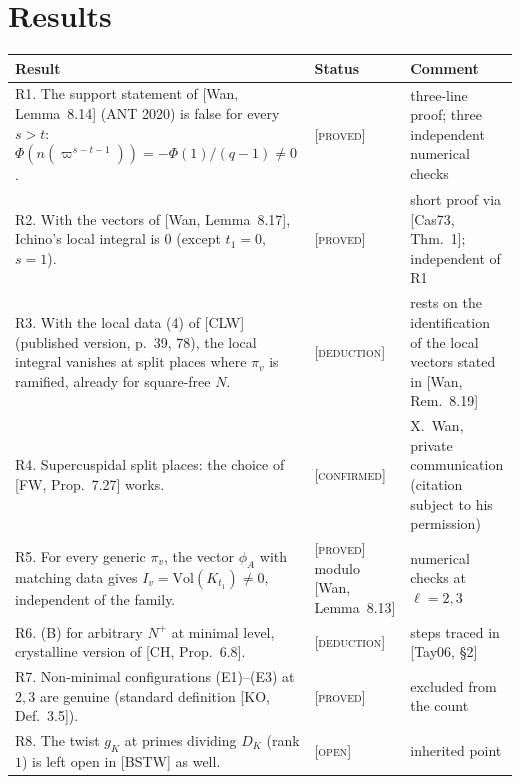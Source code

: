 \documentclass[11pt]{amsart}
\newcommand{\stat}[1]{\textsc{[#1]}}
\newcommand{\Vol}{\mathrm{Vol}}
\begin{document}
\section{Results}
\begin{center}\small
\begin{tabular}{p{7.4cm}p{2.3cm}p{4.2cm}}
\toprule
Result & Status & Comment\\ \midrule
R1. The support statement of [Wan, Lemma~8.14] (ANT 2020) is false for every $s>t$: $\Phi(n(\varpi^{s-t-1}))=-\Phi(1)/(q-1)\neq0$. & \stat{proved} & three-line proof; three independent numerical checks\\
R2. With the vectors of [Wan, Lemma~8.17], Ichino's local integral is $0$ (except $t_1=0$, $s=1$). & \stat{proved} & short proof via [Cas73, Thm.~1]; independent of R1\\
R3. With the local data (4) of [CLW] (published version, p.~39, 78), the local integral vanishes at split places where $\pi_v$ is ramified, already for square-free $N$. & \stat{deduction} & rests on the identification of the local vectors stated in [Wan, Rem.~8.19]\\
R4. Supercuspidal split places: the choice of [FW, Prop.~7.27] works. & \stat{confirmed} & X.~Wan, private communication (citation subject to his permission)\\
R5. For every generic $\pi_v$, the vector $\phi_A$ with matching data gives $I_v=\Vol(K_{t_1})\neq0$, independent of the family. & \stat{proved} modulo [Wan, Lemma~8.13] & numerical checks at $\ell=2,3$\\
R6. (B) for arbitrary $N^+$ at minimal level, crystalline version of [CH, Prop.~6.8]. & \stat{deduction} & steps traced in [Tay06, \S2]\\
R7. Non-minimal configurations (E1)--(E3) at $2,3$ are genuine (standard definition [KO, Def.~3.5]). & \stat{proved} & excluded from the count\\
R8. The twist $g_K$ at primes dividing $D_K$ (rank $1$) is left open in [BSTW] as well. & \stat{open} & inherited point\\ \bottomrule
\end{tabular}
\end{center}
\end{document}
